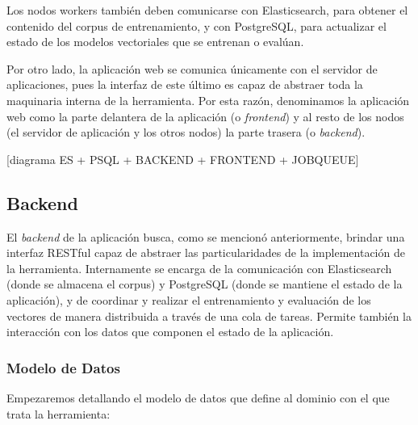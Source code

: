 Los nodos workers también deben comunicarse con Elasticsearch, para obtener el contenido del
corpus de entrenamiento, y con PostgreSQL, para actualizar el estado de los modelos vectoriales que
se entrenan o evalúan.

Por otro lado, la aplicación web se comunica únicamente con el servidor de aplicaciones, pues la
interfaz de este último es capaz de abstraer toda la maquinaria interna de la herramienta. Por esta
razón, denominamos la aplicación web como la parte delantera de la aplicación (o \textit{frontend})
y al resto de los nodos (el servidor de aplicación y los otros nodos) la parte trasera (o
\textit{backend}).

[diagrama ES + PSQL + BACKEND + FRONTEND + JOBQUEUE]


\subsection{Backend}

El \textit{backend} de la aplicación busca, como se mencionó anteriormente, brindar una interfaz
RESTful capaz de abstraer las particularidades de la implementación de la herramienta. Internamente
se encarga de la comunicación con Elasticsearch (donde se almacena el corpus) y PostgreSQL (donde se
mantiene el estado de la aplicación), y de coordinar y realizar el entrenamiento y evaluación de los
vectores de manera distribuida a través de una cola de tareas. Permite también la interacción con
los datos que componen el estado de la aplicación.


\subsubsection{Modelo de Datos}

Empezaremos detallando el modelo de datos que define al dominio con el que trata la herramienta:

